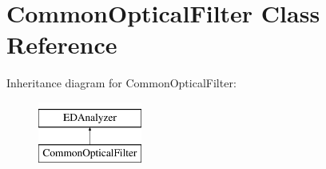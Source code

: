 \hypertarget{classCommonOpticalFilter}{\section{Common\-Optical\-Filter Class Reference}
\label{classCommonOpticalFilter}
}
Inheritance diagram for Common\-Optical\-Filter\-:\begin{figure}[H]
\begin{center}
\leavevmode
\includegraphics[height=2.000000cm]{classCommonOpticalFilter}
\end{center}
\end{figure}
